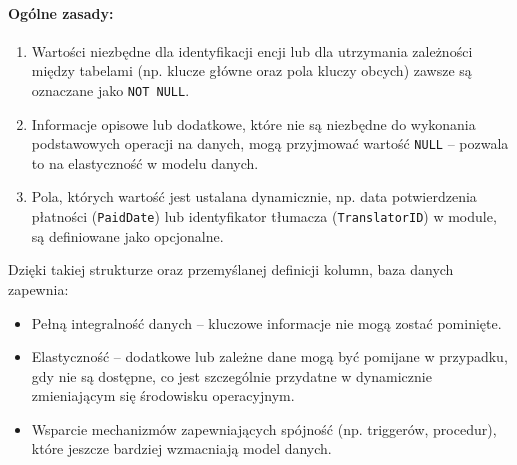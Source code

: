\documentclass[12pt]{article}
\begin{document}
\paragraph{Ogólne zasady:}
\begin{enumerate}
    \item Wartości niezbędne dla identyfikacji encji lub dla utrzymania zależności między tabelami (np. klucze główne oraz pola kluczy obcych) zawsze są oznaczane jako \texttt{NOT NULL}.
    \item Informacje opisowe lub dodatkowe, które nie są niezbędne do wykonania podstawowych operacji na danych, mogą przyjmować wartość \texttt{NULL} – pozwala to na elastyczność w modelu danych.
    \item Pola, których wartość jest ustalana dynamicznie, np. data potwierdzenia płatności (\texttt{PaidDate}) lub identyfikator tłumacza (\texttt{TranslatorID}) w module, są definiowane jako opcjonalne.
\end{enumerate}

Dzięki takiej strukturze oraz przemyślanej definicji kolumn, baza danych zapewnia:
\begin{itemize}
    \item Pełną integralność danych – kluczowe informacje nie mogą zostać pominięte.
    \item Elastyczność – dodatkowe lub zależne dane mogą być pomijane w przypadku, gdy nie są dostępne, co jest szczególnie przydatne w dynamicznie zmieniającym się środowisku operacyjnym.
    \item Wsparcie mechanizmów zapewniających spójność (np. triggerów, procedur), które jeszcze bardziej wzmacniają model danych.
\end{itemize}

\newpage
\end{document}
